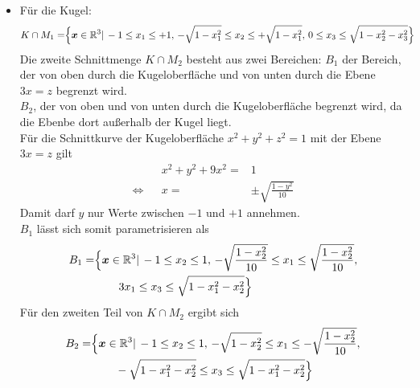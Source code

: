 {\begin{itemize}
\item F\"ur die Kugel: 
\begin{align*}
K\cap M_1=&\Bigl\{\boldsymbol x\in \mathbb{R}^3|\, -1\leq x_1\leq +1,\, -\sqrt{1-x_1^2}\leq x_2\leq +\sqrt{1-x_1^2},\, 0\leq x_3\leq \sqrt{1-x_2^2-x_3^2}\Bigr\}
\end{align*}
Die zweite Schnittmenge $K\cap M_2$ besteht aus zwei Bereichen: 
$B_1$ der Bereich, der von oben durch die Kugeloberfl\"ache und von unten durch die Ebene $3x=z$ begrenzt wird. \\
$B_2$, der von oben und von unten durch die Kugeloberfl\"ache begrenzt wird, da die Ebenbe dort außerhalb der Kugel liegt. \\
F\"ur die Schnittkurve der Kugeloberfl\"ache $x^2+y^2+z^2=1$ mit der Ebene $3x=z$ gilt
\begin{align*}
&&x^2+y^2+9x^2=&1\\
\Leftrightarrow&&x=&\pm\sqrt{\frac{1-y^2}{10}}
\end{align*}
Damit darf $y$ nur Werte zwischen $-1$ und $+1$ annehmen.\\
$B_1$ l\"asst sich somit parametrisieren als
\begin{align*}
B_1=&\Bigl\{\boldsymbol x\in \mathbb{R}^3|\, -1\leq x_2\leq 1,\, -\sqrt{\frac{1-x_2^2}{10}}\leq x_1\leq \sqrt{\frac{1-x_2^2}{10}},\\
&\qquad \,3x_1\leq x_3\leq \sqrt{1-x_1^2-x_2^2}\Bigr\}\\
\end{align*}
F\"ur den zweiten Teil von $K\cap M_2$ ergibt sich
\begin{align*}
B_2=&\Bigl\{\boldsymbol x\in \mathbb{R}^3|\, -1\leq x_2\leq 1,\, -\sqrt{1-x_2^2}\leq x_1\leq -\sqrt{\frac{1-x_2^2}{10}},\\
&\qquad \,-\sqrt{1-x_1^2-x_2^2}\leq x_3\leq \sqrt{1-x_1^2-x_2^2}\Bigr\}\\
\end{align*}


\end{itemize}}
